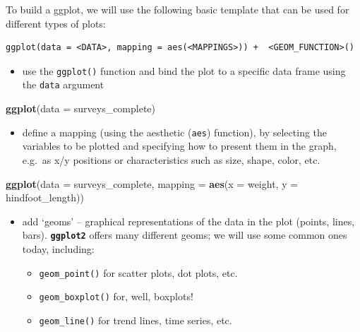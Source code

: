 \documentclass[]{book}
\newenvironment{Shaded}{\begin{snugshade}}{\end{snugshade}}
\newcommand{\KeywordTok}[1]{\textcolor[rgb]{0.13,0.29,0.53}{\textbf{#1}}}
\newcommand{\DataTypeTok}[1]{\textcolor[rgb]{0.13,0.29,0.53}{#1}}
\newcommand{\NormalTok}[1]{#1}
\providecommand{\tightlist}{%
  \setlength{\itemsep}{0pt}\setlength{\parskip}{0pt}}
\begin{document}
To build a ggplot, we will use the following basic template that can be
used for different types of plots:

\begin{verbatim}
ggplot(data = <DATA>, mapping = aes(<MAPPINGS>)) +  <GEOM_FUNCTION>()
\end{verbatim}

\begin{itemize}
\tightlist
\item
  use the \texttt{ggplot()} function and bind the plot to a specific
  data frame using the \texttt{data} argument
\end{itemize}

\begin{Shaded}
\begin{Highlighting}[]
\KeywordTok{ggplot}\NormalTok{(}\DataTypeTok{data =}\NormalTok{ surveys_complete)}
\end{Highlighting}
\end{Shaded}

\begin{itemize}
\tightlist
\item
  define a mapping (using the aesthetic (\texttt{aes}) function), by
  selecting the variables to be plotted and specifying how to present
  them in the graph, e.g.~as x/y positions or characteristics such as
  size, shape, color, etc.
\end{itemize}

\begin{Shaded}
\begin{Highlighting}[]
\KeywordTok{ggplot}\NormalTok{(}\DataTypeTok{data =}\NormalTok{ surveys_complete, }\DataTypeTok{mapping =} \KeywordTok{aes}\NormalTok{(}\DataTypeTok{x =}\NormalTok{ weight, }\DataTypeTok{y =}\NormalTok{ hindfoot_length))}
\end{Highlighting}
\end{Shaded}

\begin{itemize}
\item
  add `geoms' -- graphical representations of the data in the plot
  (points, lines, bars). \textbf{\texttt{ggplot2}} offers many different
  geoms; we will use some common ones today, including:

  \begin{itemize}
  \tightlist
  \item
    \texttt{geom\_point()} for scatter plots, dot plots, etc.
  \item
    \texttt{geom\_boxplot()} for, well, boxplots!
  \item
    \texttt{geom\_line()} for trend lines, time series, etc.
  \end{itemize}
\end{itemize}
\end{document}
